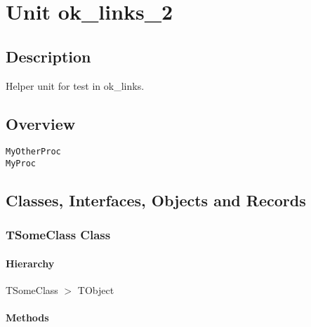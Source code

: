 \documentclass{report}
\newif\ifpdf
\begin{document}
\chapter{Unit ok{\_}links{\_}2}
\label{ok_links_2}
\section{Description}
Helper unit for test in ok{\_}links.
\section{Overview}
\begin{description}
\item[\texttt{\begin{ttfamily}TSomeClass\end{ttfamily} Class}]
\item[\texttt{\begin{ttfamily}TSomeOtherClass\end{ttfamily} Class}]
\end{description}
\begin{description}
\item[\texttt{MyOtherProc}]
\item[\texttt{MyProc}]
\end{description}
\section{Classes, Interfaces, Objects and Records}
\ifpdf
\subsection*{\large{\textbf{TSomeClass Class}}\normalsize\hspace{1ex}\hrulefill}
\else
\subsection*{TSomeClass Class}
\fi
\label{ok_links_2.TSomeClass}
\subsubsection*{\large{\textbf{Hierarchy}}\normalsize\hspace{1ex}\hfill}
TSomeClass {$>$} TObject
\subsubsection*{\large{\textbf{Methods}}\normalsize\hspace{1ex}\hfill}
\end{document}
